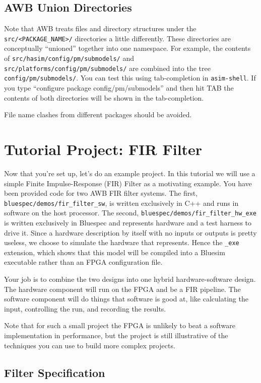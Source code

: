 \documentclass{article}
\begin{document}
\subsection{AWB Union Directories}

Note that AWB treats files and directory structures under the \texttt{src/<PACKAGE\_NAME>/} directories a little differently. These directories are conceptually
``unioned'' together into one namespace. For example, the contents of \texttt{src/hasim/config/pm/submodels/} and \texttt{src/platforms/config/pm/submodels/} are
combined into the tree \texttt{config/pm/submodels/}. You can test this using tab-completion in \texttt{asim-shell}. If you type ``configure package
config/pm/submodels'' and then hit TAB the contents of both directories will be shown in the tab-completion.

File name clashes from different packages should be avoided.

\section{Tutorial Project: FIR Filter}

Now that you're set up, let's do an example project. In this tutorial we will use a simple Finite Impulse-Response (FIR) Filter as a motivating example. You have
been provided code for two AWB FIR filter systems. The first, \texttt{bluespec/demos/fir\_filter\_sw}, is written exclusively in C++ and runs in software on the
host processor. The second, \texttt{bluespec/demos/fir\_filter\_hw\_exe} is written exclusively in Bluespec and represents hardware and a test harness to drive it.
Since a hardware description by itself with no inputs or outputs is pretty useless, we choose to simulate the hardware that represents. Hence the \texttt{\_exe}
extension, which shows that this model will be compiled into a Bluesim executable rather than an FPGA configuration file.

Your job is to combine the two designs into one hybrid hardware-software design. The hardware component will run on the FPGA and be
a FIR pipeline. The software component will do things that software is good at, like calculating the input, controlling the run, and
recording the results.

Note that for such a small project the FPGA is unlikely to beat a software implementation in performance, but the project is still
illustrative of the techniques you can use to build more complex projects.

\subsection{Filter Specification}
\end{document}
